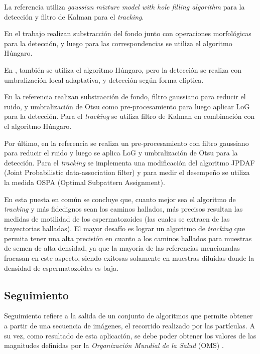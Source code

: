 La referencia \cite{Nurhadiyatna} utiliza \textit {gaussian mixture model with hole filling algorithm} para la detección y filtro de Kalman para el \textit{tracking}. 

En el trabajo \cite{imani} realizan substracción del fondo junto con operaciones morfológicas para la detección, y luego para las correspondencias se utiliza el algoritmo Húngaro. 

En \cite{Hidayatullah}, también se utiliza el algoritmo Húngaro, pero la detección se realiza con umbralización local adaptativa, y detección según forma elíptica. 

En la referencia \cite{jati} realizan substracción de fondo, filtro gaussiano para reducir el ruido, y umbralización de Otsu como pre-procesamiento para luego aplicar LoG para la detección. Para el \textit{tracking} se utiliza filtro de Kalman en combinación con el algoritmo Húngaro. 

Por último, en la referencia \cite{urbano} se realiza un pre-procesamiento con filtro gaussiano para reducir el ruido y luego se aplica LoG y umbralización de Otsu para la detección. Para el \textit{tracking} se implementa una modificación del algoritmo JPDAF (Joint Probabilistic data-association filter) y para medir el desempeño se utiliza la medida OSPA (Optimal Subpattern Assignment). 

En esta puesta en común se concluye que, cuanto mejor sea el algoritmo de \textit{tracking} y más fidedignos sean los caminos hallados, más precisos resultan las medidas de motilidad de los espermatozoides (las cuales se extraen de las trayectorias halladas). El mayor desafío es lograr un algoritmo de \textit{tracking} que permita tener una alta precisión en cuanto a los caminos hallados para muestras de semen de alta densidad, ya que la mayoría de las referencias mencionadas fracasan en este aspecto, siendo exitosas solamente en muestras diluidas donde la densidad de espermatozoides es baja. 

\subsection{Seguimiento}

Seguimiento refiere a la salida de un conjunto de algoritmos que permite obtener a partir de una secuencia de imágenes, el recorrido realizado por las partículas. A su vez, como resultado de esta aplicación, se debe poder obtener los valores de las magnitudes definidas por la \textit{Organización Mundial de la Salud} (OMS) \cite{WHOmanual}.

